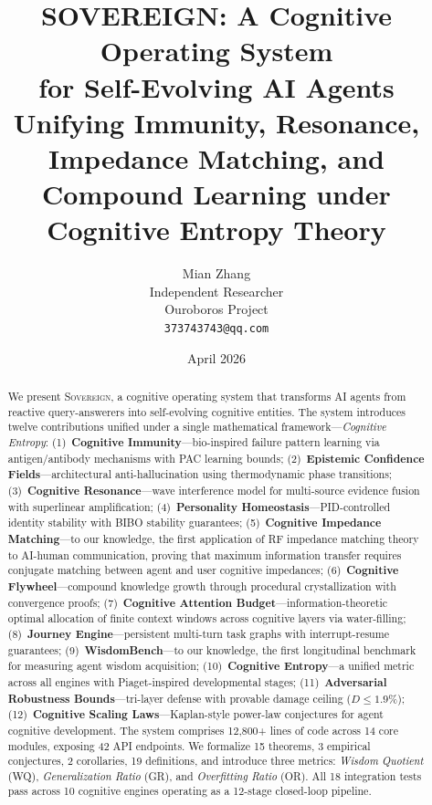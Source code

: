 \documentclass[11pt,a4paper]{article}
\title{
  \textbf{SOVEREIGN: A Cognitive Operating System\\for Self-Evolving AI Agents}\\[0.5em]
  \large Unifying Immunity, Resonance, Impedance Matching, and\\
  Compound Learning under Cognitive Entropy Theory
}
\author{
  Mian Zhang\\
  Independent Researcher\\
  Ouroboros Project\\
  \texttt{373743743@qq.com}
}
\date{April 2026}
\begin{document}
\maketitle

\begin{abstract}
We present \textsc{Sovereign}, a cognitive operating system that transforms
AI agents from reactive query-answerers into self-evolving cognitive entities.
The system introduces twelve contributions unified under a single mathematical
framework---\emph{Cognitive Entropy}:
(1)~\textbf{Cognitive Immunity}---bio-inspired failure pattern learning via
antigen/antibody mechanisms with PAC learning bounds;
(2)~\textbf{Epistemic Confidence Fields}---architectural anti-hallucination
using thermodynamic phase transitions;
(3)~\textbf{Cognitive Resonance}---wave interference model for multi-source
evidence fusion with superlinear amplification;
(4)~\textbf{Personality Homeostasis}---PID-controlled identity stability
with BIBO stability guarantees;
(5)~\textbf{Cognitive Impedance Matching}---to our knowledge, the first application of RF
impedance matching theory to AI-human communication, proving that maximum
information transfer requires conjugate matching between agent and user
cognitive impedances;
(6)~\textbf{Cognitive Flywheel}---compound knowledge growth through
procedural crystallization with convergence proofs;
(7)~\textbf{Cognitive Attention Budget}---information-theoretic optimal
allocation of finite context windows across cognitive layers via
water-filling;
(8)~\textbf{Journey Engine}---persistent multi-turn task graphs with
interrupt-resume guarantees;
(9)~\textbf{WisdomBench}---to our knowledge, the first longitudinal benchmark for measuring
agent wisdom acquisition;
(10)~\textbf{Cognitive Entropy}---a unified metric across all engines with
Piaget-inspired developmental stages;
(11)~\textbf{Adversarial Robustness Bounds}---tri-layer defense with
provable damage ceiling ($D \leq 1.9\%$);
(12)~\textbf{Cognitive Scaling Laws}---Kaplan-style power-law conjectures for
agent cognitive development.
The system comprises 12,800+ lines of code across 14 core modules, exposing 42
API endpoints. We formalize 15 theorems, 3 empirical conjectures, 2 corollaries, 19 definitions, and introduce three
metrics: \emph{Wisdom Quotient} (WQ), \emph{Generalization Ratio} (GR),
and \emph{Overfitting Ratio} (OR). All 18 integration tests pass across 10
cognitive engines operating as a 12-stage closed-loop pipeline.
\end{abstract}
\end{document}
